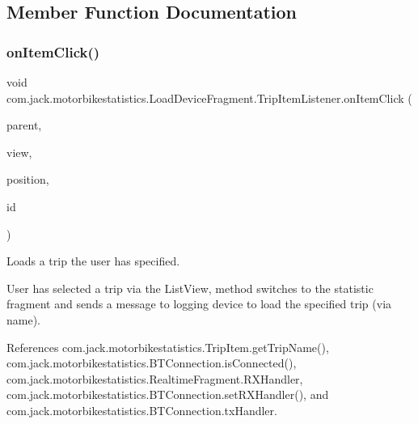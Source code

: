 \subsection{Member Function Documentation}
\mbox{\label{classcom_1_1jack_1_1motorbikestatistics_1_1_load_device_fragment_1_1_trip_item_listener_a35dc92993831e354573218d4300a2f2a}} 
\subsubsection{\texorpdfstring{on\+Item\+Click()}{onItemClick()}}
{\footnotesize\ttfamily void com.\+jack.\+motorbikestatistics.\+Load\+Device\+Fragment.\+Trip\+Item\+Listener.\+on\+Item\+Click (\begin{DoxyParamCaption}\item[{Adapter\+View$<$?$>$}]{parent,  }\item[{View}]{view,  }\item[{int}]{position,  }\item[{long}]{id }\end{DoxyParamCaption})\hspace{0.3cm}{\ttfamily [inline]}}



Loads a trip the user has specified. 

User has selected a trip via the List\+View, method switches to the statistic fragment and sends a message to logging device to load the specified trip (via name). 

References com.\+jack.\+motorbikestatistics.\+Trip\+Item.\+get\+Trip\+Name(), com.\+jack.\+motorbikestatistics.\+B\+T\+Connection.\+is\+Connected(), com.\+jack.\+motorbikestatistics.\+Realtime\+Fragment.\+R\+X\+Handler, com.\+jack.\+motorbikestatistics.\+B\+T\+Connection.\+set\+R\+X\+Handler(), and com.\+jack.\+motorbikestatistics.\+B\+T\+Connection.\+tx\+Handler.


